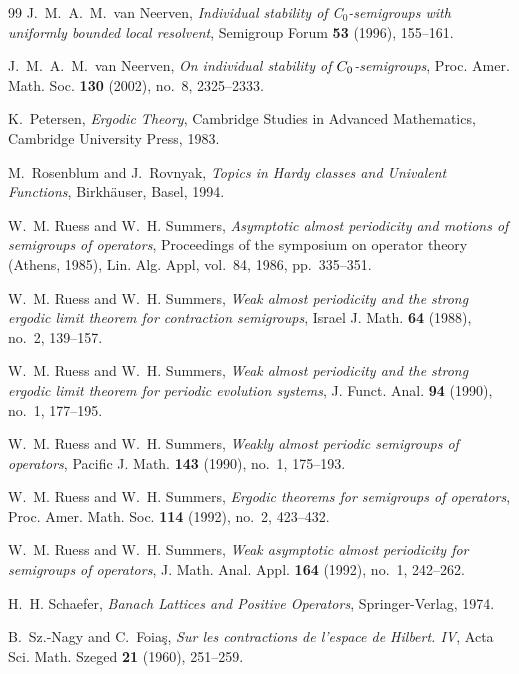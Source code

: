 \documentclass[11pt,intlimits, draft,oneside]{amsart}
\theoremstyle{definition}
\begin{document}
\begin{thebibliography}{99}
J.~M.~A.~M.~van Neerven, %
\textit{Individual stability of {C}$_0$-semigroups with uniformly bounded local resolvent}, %
Semigroup Forum \textbf{53} (1996), 155--161. %


{J.~M.~A.~M.~van Neerven}, %
\textit{On individual stability of {$C\sb 0$}-semigroups}, %
{Proc. Amer. Math. Soc.} \textbf{130} (2002), no.~8, 2325--2333. %


K.~Petersen, %
\textit{Ergodic {T}heory}, %
Cambridge Studies in Advanced Mathematics, Cambridge University Press, 1983. %


M.~Rosenblum and J.~Rovnyak, %
\textit{Topics in {H}ardy classes and Univalent Functions}, %
Birkh\"{a}user, Basel, 1994. %


W.~M. Ruess and W.~H. Summers, %
\textit{Asymptotic almost periodicity and motions of semigroups of operators}, %
Proceedings of the symposium on operator theory (Athens, 1985), Lin. Alg. Appl, vol.~84, 1986, pp.~335--351. %


W.~M. Ruess and W.~H. Summers, %
\textit{Weak almost periodicity and the strong ergodic limit theorem for contraction semigroups}, %
Israel J. Math. \textbf{64} (1988), no.~2, 139--157. %


W.~M. Ruess and W.~H. Summers, %
\textit{Weak almost periodicity and the strong ergodic limit theorem for periodic evolution systems}, %
J. Funct. Anal. \textbf{94} (1990), no.~1, 177--195. %


W.~M. Ruess and W.~H. Summers, %
\textit{Weakly almost periodic semigroups of operators}, %
Pacific J. Math. \textbf{143} (1990), no.~1, 175--193. %


W.~M. Ruess and W.~H. Summers, %
\textit{Ergodic theorems for semigroups of operators}, %
Proc. Amer. Math. Soc. \textbf{114} (1992), no.~2, 423--432. %


W.~M. Ruess and W.~H. Summers, %
\textit{Weak asymptotic almost periodicity for semigroups of operators}, %
J. Math. Anal. Appl. \textbf{164} (1992), no.~1, 242--262. %


H.~H. Schaefer, %
\textit{Banach {L}attices and {P}ositive {O}perators}, %
Springer-Verlag, 1974. %


B.~Sz.-Nagy and C.~Foia{\c{s}}, %
\textit{Sur les contractions de l'espace de {H}ilbert. {IV}}, %
Acta Sci. Math. Szeged \textbf{21} (1960), 251--259. %



\end{thebibliography}
\end{document}
